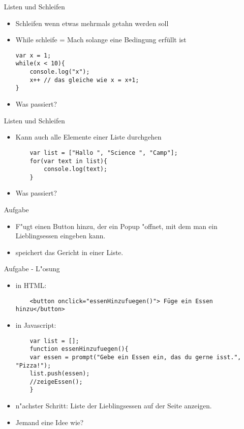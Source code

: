 \documentclass[18pt]{beamer}
\begin{document}
\begin{frame}[fragile]{Listen und Schleifen}
\begin{itemize}
\item Schleifen wenn etwas mehrmals getahn werden soll
\item While schleife = \glqq Mach solange eine Bedingung erfüllt ist\grqq
\begin{lstlisting}
var x = 1;
while(x < 10){
	console.log("x");
	x++ // das gleiche wie x = x+1;
}
\end{lstlisting}
\item Was passiert? 
\end{itemize}
\end{frame}

\begin{frame}[fragile]{Listen und Schleifen}
\begin{itemize}
	\item Kann auch alle Elemente einer Liste durchgehen
	\begin{lstlisting}
	var list = ["Hallo ", "Science ", "Camp"];
	for(var text in list){
		console.log(text);
	}
	\end{lstlisting}
	\item Was passiert? 
\end{itemize}
\end{frame}

\begin{frame}[fragile]{Aufgabe}
\begin{itemize}
	\item F"ugt einen Button hinzu, der ein Popup "offnet, mit dem man ein Lieblingsessen eingeben kann.
	\item speichert das Gericht in einer Liste.
\end{itemize}
\end{frame}

\begin{frame}[fragile]{Aufgabe - L"osung}
\begin{itemize}
 	\item in HTML:
 	\begin{lstlisting}
    <button onclick="essenHinzufuegen()"> Füge ein Essen hinzu</button>
 	\end{lstlisting}
 	\item in Javascript:
 	\begin{lstlisting}
 	var list = [];
 	function essenHinzufuegen(){
 	var essen = prompt("Gebe ein Essen ein, das du gerne isst.", "Pizza!");
 	list.push(essen);
 	//zeigeEssen();
 	}
 	\end{lstlisting}
 	\item n"achster Schritt: Liste der Lieblingsessen auf der Seite anzeigen. 
 	\item Jemand eine Idee wie?
\end{itemize}
\end{frame}
\end{document}

